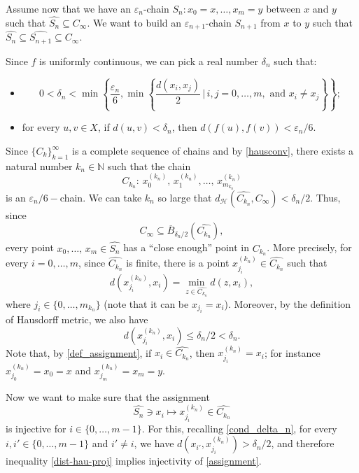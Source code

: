 \documentclass[10pt,a4paper]{article}
\theoremstyle{definition}
\theoremstyle{remark}
\theoremstyle{plain}
\begin{document}
    Assume now that we have an $\varepsilon_n$-chain $S_n:x_0=x,\dots,x_m=y$ between $x$ and $y$ such that $\widehat{S_n}\subseteq C_\infty$. We want to build an $\varepsilon_{n+1}$-chain $S_{n+1}$ from $x$ to $y$ such that $\widehat{S_n}\subseteq \widehat{S_{n+1}}\subseteq C_\infty$.

    Since $f$ is uniformly continuous, we can pick a real number $\delta_n$ such that:
    \begin{itemize}
        \item 
    \begin{equation}\label{cond_delta_n}
        0<\delta_n<\min\left\{\frac{\varepsilon_n}{6},\min\left\{\frac{d(x_i,x_j)}{2}\,\Bigg\vert\,i,j=0,\dots,m,\text{ and }x_i\neq x_j\right\}\right\};
    \end{equation}
    \item 
    
    for every $u,v\in X$, if $d(u,v)<\delta_n$, then $d(f(u),f(v))<\varepsilon_n/6$.
    \end{itemize}
    Since $\{C_k\}_{k=1}^\infty$ is a complete sequence of chains and by \eqref{hausconv}, there exists a natural number $k_n\in\mathbb{N}$  such that the chain
    $$C_{k_n}:\,x_0^{(k_n)},\,x^{(k_n)}_1,\dots,\,x_{m_{k_n}}^{(k_n)}$$
    is an $\varepsilon_n/6-$chain. We can take $k_n$ so large that $d_\mathcal{H}(\widehat{C_{k_n}},C_\infty)<\delta_n/2$. 
    Thus, since
    $$C_\infty\subseteq \overline{B}_{\delta_n/2}(\widehat{C_{k_n}}),$$
    every point $x_0,\dots,\,x_m\in\widehat{S_n}$ has a ``close enough'' point in $\widehat{C_{k_n}}$. More precisely,  
    for every $i=0,\dots,m$, since $\widehat{C_{k_n}}$ is finite, there is a point $x_{j_i}^{(k_n)}\in \widehat{C_{k_n}}$ such that
    \begin{equation}\label{def_assignment}
        d(x_{j_i}^{(k_n)},x_i)= \min_{z\in \widehat{C_{k_n}}}d(z,x_i),
    \end{equation}
    where $j_i\in\{0,\dots,m_{k_n}\}$ (note that it can be $x_{j_i}=x_i$).
    Moreover, by the definition of Hausdorff metric, we also have 
    \begin{equation}\label{dist-hau-proj}
        d(x_{j_i}^{(k_n)},x_i)\leq\delta_n/2<\delta_n.
    \end{equation}
    Note that, by \eqref{def_assignment}, if $x_i\in\widehat{C_{k_n}}$, then $x_{j_i}^{(k_n)}=x_i$; for instance $x_{j_0}^{(k_n)}=x_0=x$ and $x_{j_m}^{(k_n)}=x_m=y$.
    
    Now we want to make sure that the assignment
    \begin{equation}\label{assignment}
        \widehat{S_n}\ni x_i\mapsto x_{j_i}^{(k_n)}\in\widehat{C_{k_n}}
    \end{equation}
    is injective for $i\in\{0,\dots,m-1\}$. For this, recalling \eqref{cond_delta_n},    
    for every $i,i'\in\{0,\dots,m-1\}$ and $i'\neq i$, we have $d(x_{i'},x_{j_i}^{(k_n)})>\delta_n/2$, and therefore inequality \eqref{dist-hau-proj} implies injectivity of \eqref{assignment}.
    
\end{document}
